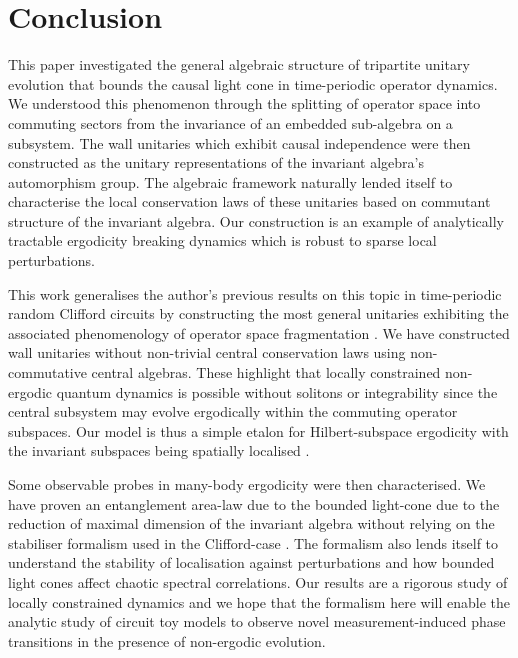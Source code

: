 \documentclass[11pt, twocolumn, floatfix, superscriptaddress, aps, prb, raggedbottom]{revtex4-2}
\begin{document}
\section{Conclusion}

This paper investigated the general algebraic structure of tripartite unitary evolution that bounds the causal light cone in time-periodic operator dynamics. We understood this phenomenon through the splitting of operator space into commuting sectors from the invariance of an embedded sub-algebra on a subsystem. The wall unitaries which exhibit causal independence were then constructed as the unitary representations of the invariant algebra's automorphism group.  The algebraic framework naturally lended itself to characterise the local conservation laws of these unitaries based on commutant structure of the invariant algebra. Our construction is an example of analytically tractable ergodicity breaking dynamics which is robust to sparse local perturbations. 



This work generalises the author's previous results on this topic in time-periodic random Clifford circuits by constructing the most general unitaries exhibiting the associated phenomenology of operator space fragmentation \cite{Kovacs2026}.  We have constructed wall unitaries without non-trivial central conservation laws using non-commutative central algebras. These highlight that locally constrained non-ergodic quantum dynamics is possible without solitons or integrability since the central subsystem may evolve ergodically within the commuting operator subspaces. Our model is thus a simple etalon for Hilbert-subspace ergodicity with the invariant subspaces being spatially localised \cite{Logaric2025}.

Some observable probes in many-body ergodicity were then characterised. We have proven an entanglement area-law due to the bounded light-cone due to the reduction of maximal dimension of the invariant algebra without relying on the stabiliser formalism used in the Clifford-case \cite{Kovacs2026}. The formalism also lends itself to understand the stability of localisation against perturbations and how bounded light cones affect chaotic spectral correlations.  Our results are a rigorous study of locally constrained dynamics and we hope that the formalism here will enable the analytic study of circuit toy models to observe novel measurement-induced phase transitions in the presence of non-ergodic evolution. 
\end{document}

